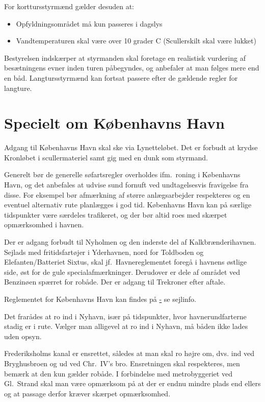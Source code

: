 \documentclass{article}
\begin{document}
For korttursstyrmænd gælder desuden at:
\begin{itemize}
    \item Opfyldningsområdet må kun passeres i dagslys
    \item Vandtemperaturen skal være over 10 grader C (Scullerskilt skal
        være lukket)
\end{itemize}

Bestyrelsen indskærper at styrmanden skal foretage en realistisk
vurdering af besætningens evner inden turen påbegyndes, og anbefaler at
man følges mere end en båd. Langtursstyrmænd kan fortsat passere efter de
gældende regler for langture.

\section{Specielt om Københavns Havn}

Adgang til Københavns Havn skal ske via Lynetteløbet. Det er forbudt at
krydse Kronløbet i scullermateriel samt gig med en dunk som styrmand.

Generelt bør de generelle søfartsregler overholdes ifm.\ roning i
Københavns Havn, og det anbefales at udvise sund fornuft ved
undtagelsesvis fravigelse fra disse. For eksempel bør afmærkning af
større anlægsarbejder respekteres og en eventuel alternativ rute
planlægges i god tid. Københavns Havn kan på særlige tidspunkter være
særdeles trafikeret, og der bør altid roes med skærpet opmærksomhed i
havnen.

Der er adgang forbudt til Nyholmen og den inderste del af
Kalkbrænderihavnen. Sejlads med fritidsfartøjer i Yderhavnen, nord for
Toldboden og Elefanten/Batteriet Sixtus, skal jf.\ Havnereglementet foregå
i havnens østlige side, øst for de gule specialafmærkninger. Derudover
er dele af området ved Benzinøen spærret for robåde. Der er adgang til
Trekroner efter aftale.

Reglementet for Københavns Havn kan findes på
\href{http://www.byoghavn.dk/cphport.aspx} - se sejlinfo.

Det frarådes at ro ind i Nyhavn, især på tidspunkter, hvor
havnerundfarterne stadig er i rute. Vælger man alligevel at ro ind i
Nyhavn, må båden ikke lades uden opsyn.

Frederiksholms kanal er ensrettet, således at man skal ro højre om, dvs.
ind ved Bryghusbroen og ud ved Chr.\ IV's bro. Ensretningen skal
respekteres, men bemærk at den kun gælder robåde. I forbindelse med
metrobyggeriet ved Gl.\ Strand skal man være opmærksom på at der er endnu
mindre plads end ellers og at passage derfor kræver skærpet opmærksomhed.
\end{document}

